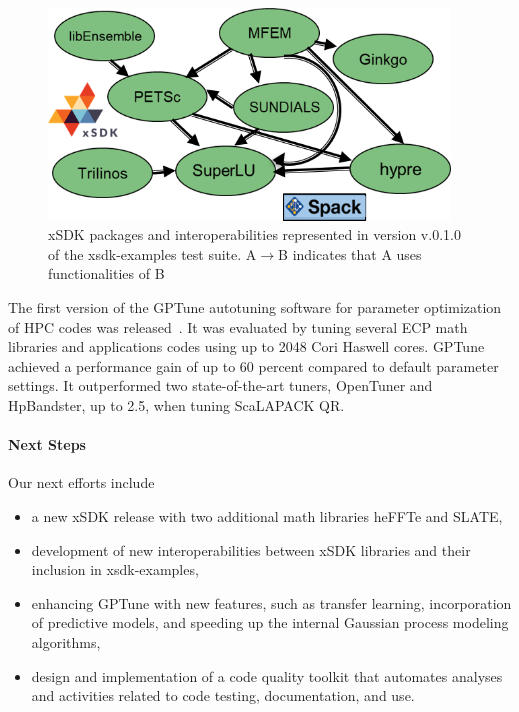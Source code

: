 \begin{figure}[htb]
	\centering
	\includegraphics[width=4.2in]{projects/2.3.3-MathLibs/2.3.3.01-xSDK/xSDK-examples-diagram.png}
	\caption{\label{fig:xsdk-schematic} xSDK packages and interoperabilities represented in version v.0.1.0 of the xsdk-examples test suite. A$\rightarrow$B indicates that A uses functionalities of B}
\end{figure}


The first version of the GPTune autotuning software for parameter optimization of HPC codes was released~\cite{gptune:homepage}. It was evaluated by tuning several ECP math libraries and applications codes using up to 2048 Cori Haswell cores. GPTune achieved a performance gain of up to 60 percent compared to default parameter settings. It outperformed two state-of-the-art tuners, OpenTuner and HpBandster, up to 2.5, when tuning ScaLAPACK QR.


\paragraph{Next Steps}

Our next efforts include 
\begin{itemize}
    \item a new xSDK release with two additional math libraries heFFTe and SLATE, 
    \item development of new interoperabilities between xSDK libraries and their inclusion in xsdk-examples, 
    \item enhancing GPTune with new features, such as transfer learning, incorporation of predictive models, and speeding up the internal Gaussian process modeling algorithms,
    \item design and implementation of a code quality toolkit that automates analyses and activities related to code testing, documentation, and use.
    
\end{itemize}

